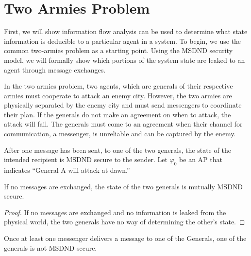 \section{Two Armies Problem}

First, we will show information flow analysis can be used to determine what state information is deducible to a particular agent in a system.
To begin, we use the common two-armies problem as a starting point.
Using the MSDND security model, we will formally show which portions of the system state are leaked to an agent through message exchanges.

In the two armies problem, two agents, which are generals of their respective armies must cooperate to attack an enemy city.
However, the two armies are physically separated by the enemy city and must send messengers to coordinate their plan.
If the generals do not make an agreement on when to attack, the attack will fail.
The generals must come to an agreement when their channel for communication, a messenger, is unreliable and can be captured by the enemy.

After one message has been sent, to one of the two generals, the state of the intended recipient is MSDND secure to the sender.
Let $\varphi_0$ be an \ac{AP} that indicates ``General A will attack at dawn.''

\begin{thm}
If no messages are exchanged, the state of the two generals is mutually MSDND secure. \label{thm:nomsg}
\end{thm}

\begin{proof}
If no messages are exchanged and no information is leaked from the physical world, the two generals have no way of determining the other's state.
\end{proof}

\begin{thm}
Once at least one messenger delivers a message to one of the Generals, one of the generals is not MSDND secure.
\end{thm}

